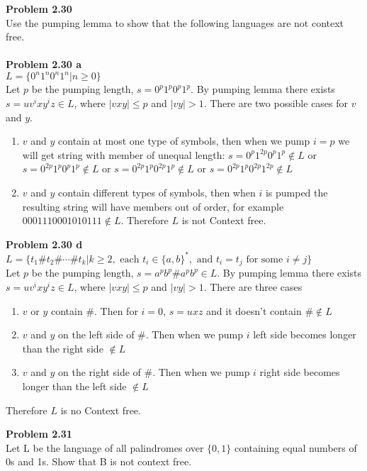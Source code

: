\documentclass{article}
\newcommand{\problem}[1]{\large{\textbf{Problem #1} \\}}
\begin{document}
\pagebreak

\problem{2.30}
Use the pumping lemma to show that the following languages are not context free. \\ \\
\problem{2.30 a}
$L = \{ 0^n 1^n 0^n 1^n | n \geq 0  \}$ \\

Let $p$ be the pumping length, $s = 0^p 1^p 0^p 1^p$. By pumping lemma 
there exists $s = uv^ixy^iz \in L$, where $|vxy| \leq p$ and $|vy| > 1$. There are two 
possible cases for $v$ and $y$.
\begin{enumerate}[\underline{Case} 1., leftmargin = 1.5cm]
\itemsep0em
\item $v$ and $y$ contain at most one type of symbols, then when
we pump $i = p$ we will get string with member of unequal length:
 $s = 0^p 1^{2p} 0^p 1^p \notin L$ or $s = 0^{2p} 1^p 0^p 1^p \notin L$ or $s = 0^{2p} 1^p 0^{2p} 1^p \notin L$ or 
$s = 0^{2p} 1^p 0^{2p} 1^{2p} \notin L$
\item $v$ and $y$ contain different types of symbols, then when $i$ is pumped the resulting 
string will have members out of order, for example $0001110001010111 \notin L$. Therefore $L$ is not Context free.
\end{enumerate}

\vspace{0.2cm}
\problem{2.30 d}
$L = \{ t_1 \# t_2 \# \cdots \# t_k | k \geq 2,\text{ each } t_i \in \{a,b\}^*,
\text{ and }t_i = t_j\text{ for some } i \neq j  \}$  \\

Let $p$ be the pumping length, $s = a^p b ^p \# a^p b^p \in L$. By pumping lemma 
there exists $s = uv^ixy^iz \in L$, where $|vxy| \leq p$ and $|vy| > 1$. There are three
cases
\begin{enumerate}[\underline{Case} 1., leftmargin = 1.5cm]
\itemsep0em
\item $v$ or $y$ contain $\#$. Then for $i = 0$, $s = uxz$ and it doesn't contain $\# \notin L$
\item $v$ and $y$ on the left side of $\#$. Then when we pump $i$ left side becomes longer than the right side $\notin L$
\item $v$ and $y$ on the right side of $\#$. Then when we pump $i$ right side becomes longer than the left side $\notin L$
\end{enumerate}

Therefore $L$ is no Context free.

\vspace{0.4cm}
\problem{2.31}
Let L be the language of all palindromes over $\{0,1\}$ containing equal numbers of 0s and 1s. 
Show that B is not context free. \\
\end{document}
